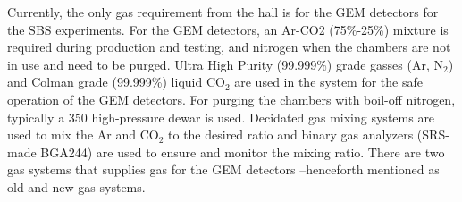 %
%
Currently, the only gas requirement from the hall is for the GEM detectors for the SBS experiments. 
For the GEM detectors, an Ar-CO2 (75\%-25\%) mixture is required during production and testing, and nitrogen when the chambers are not in use and need to be purged. 
Ultra High Purity (99.999\%) grade gasses (Ar, N$_2$) and Colman grade (99.999\%) liquid CO$_2$ are used in the system for the safe operation of the GEM detectors. 
For purging the chambers with boil-off nitrogen, typically a 350 high-pressure dewar is used. 
Decidated gas mixing systems are used to mix the Ar and CO$_2$ to the desired ratio and binary gas analyzers (SRS-made BGA244) are used to ensure and monitor the mixing ratio. 
There are two gas systems that supplies gas for the GEM detectors --henceforth mentioned as old and new gas systems.

